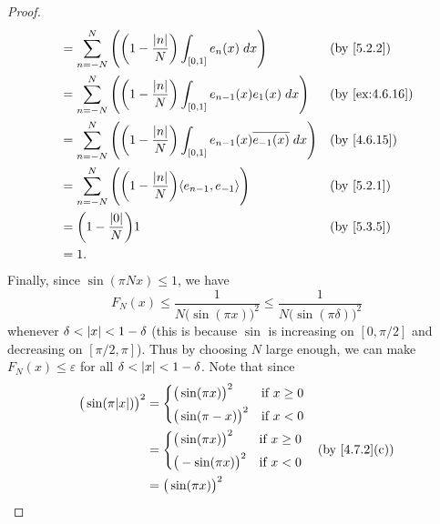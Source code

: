 \begin{proof}
\begin{align*}
     & = \sum_{n = -N}^N \Bigg(\bigg(1 - \dfrac{\abs{n}}{N}\bigg) \int_{[0, 1]} e_n(x) \; dx\Bigg)                            &  & \by{5.2.2}                   \\
     & = \sum_{n = -N}^N \Bigg(\bigg(1 - \dfrac{\abs{n}}{N}\bigg) \int_{[0, 1]} e_{n - 1}(x) e_1(x) \; dx\Bigg)               &  & \text{(by \cref{ex:4.6.16})} \\
     & = \sum_{n = -N}^N \Bigg(\bigg(1 - \dfrac{\abs{n}}{N}\bigg) \int_{[0, 1]} e_{n - 1}(x) \overline{e_{-1}(x)} \; dx\Bigg) &  & \text{(by \cref{4.6.15})}    \\
     & = \sum_{n = -N}^N \Bigg(\bigg(1 - \dfrac{\abs{n}}{N}\bigg) \inner*{e_{n - 1}, e_{-1}}\Bigg)                            &  & \by{5.2.1}                   \\
     & = \bigg(1 - \dfrac{\abs{0}}{N}\bigg) 1                                                                                 &  & \by{5.3.5}                   \\
     & = 1.
  \end{align*}
  Finally, since \(\sin(\pi N x) \leq 1\), we have
  \[
    F_N(x) \leq \dfrac{1}{N \big(\sin(\pi x)\big)^2} \leq \dfrac{1}{N \big(\sin(\pi \delta)\big)^2}
  \]
  whenever \(\delta < \left\lvert x\right\rvert < 1 - \delta\)
  (this is because \(\sin\) is increasing on \([0, \pi / 2]\) and decreasing on \([\pi / 2, \pi]\)).
  Thus by choosing \(N\) large enough, we can make \(F_N (x) \leq \varepsilon\) for all \(\delta < \left\lvert x\right\rvert < 1 - \delta\).
  Note that since
  \begin{align*}
    \big(\sin(\pi \abs{x})\big)^2 & = \begin{dcases}
                                        \big(\sin(\pi x)\big)^2  & \text{if } x \geq 0 \\
                                        \big(\sin(\pi -x)\big)^2 & \text{if } x < 0
                                      \end{dcases} \\
                                  & = \begin{dcases}
                                        \big(\sin(\pi x)\big)^2  & \text{if } x \geq 0 \\
                                        \big(-\sin(\pi x)\big)^2 & \text{if } x < 0
                                      \end{dcases} &  & \text{(by \cref{4.7.2}(c))} \\
                                  & = \big(\sin(\pi x)\big)^2
  \end{align*}

\end{proof}
